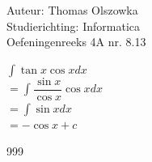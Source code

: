\documentclass[a4paper]{article}
\newcommand{\dint}{\displaystyle\int}
\begin{document}
\noindent \large Auteur: Thomas Olszowka \\
\noindent \large Studierichting: Informatica \\
\noindent \large Oefeningenreeks 4A nr. 8.13  \\



\medskip

\normalsize

$\dint \tan x \cos x dx$ \\

$= \dint \dfrac{\sin x}{\cos x} \cos x dx$ \\

$= \dint \sin x dx$ \\

$= -\cos x +c$ \\

\begin{thebibliography}{999}
\end{thebibliography}
\end{document}
